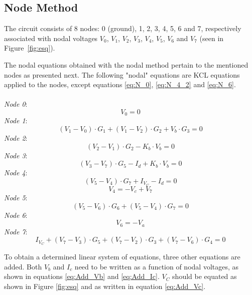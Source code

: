 \subsection{Node Method}
\label{subsec:node}


The circuit consists of 8 nodes: 0 (ground), 1, 2, 3, 4, 5, 6 and 7, respectively associated with nodal voltages $V_0$, $V_1$, $V_2$, $V_3$, $V_4$, $V_5$, $V_6$ and $V_7$ (seen in Figure~\ref{fig:esq}). 


The nodal equations obtained with the nodal method pertain to the mentioned nodes as presented next. 
The following "nodal" equations are KCL equations applied to the nodes, except equations \ref{eq:N_0}, \ref{eq:N_4_2} 
and \ref{eq:N_6}. \\
\\
\textit{Node 0}:
\begin{equation}
  V_0=0
  \label{eq:N_0}
\end{equation}
\textit{Node 1}:
\begin{equation}
    (V_1 - V_0) \cdot G_1 + (V_1 - V_2) \cdot G_2 + V_b \cdot G_3 = 0
    \label{eq:N_1}
\end{equation}
\textit{Node 2}:
\begin{equation}
    (V_2 - V_1) \cdot G_2 - K_b \cdot V_b = 0
    \label{eq:N_2}
\end{equation}
\textit{Node 3}:
\begin{equation}
    (V_3 - V_7) \cdot G_5 - I_d + K_b \cdot V_b = 0
    \label{eq:N_3}
\end{equation}
\textit{Node 4}:
\begin{equation}
    (V_5 - V_4) \cdot G_7 + I_{V_C} - I_d = 0
    \label{eq:N_4_1}
\end{equation}
\begin{equation}
    V_4 = - V_c + V_7
    \label{eq:N_4_2}
\end{equation}
\textit{Node 5}:
\begin{equation}
  (V_5 - V_6) \cdot G_6 + (V_5 - V_4) \cdot G_7 = 0
  \label{eq:N_5}
\end{equation}
\textit{Node 6}:
\begin{equation}
    V_6 = - V_a
  \label{eq:N_6}
\end{equation}
\textit{Node 7}:
\begin{equation}
  I_{V_C} + (V_7 - V_3) \cdot G_5 + (V_7 - V_2) \cdot G_3 + (V_7 - V_6) \cdot G_4 = 0
  \label{eq:N_7}
\end{equation}

To obtain a determined linear system of equations, three other equations are added. Both $V_b$ and $I_c$ need to be written as a function of nodal voltages, as shown in equations \ref{eq:Add_Vb} and \ref{eq:Add_Ic}. $V_C$ should be equated as shown in Figure \ref{fig:esq} and as written in equation \ref{eq:Add_Vc}.

